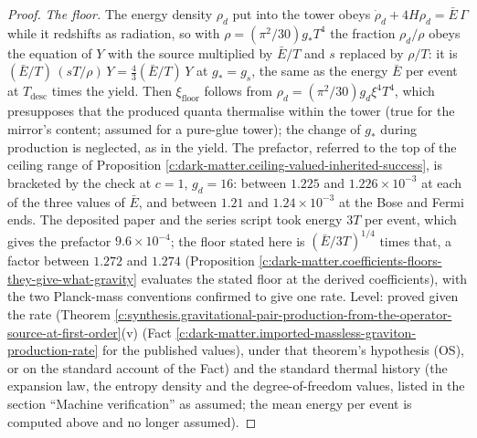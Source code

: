 \documentclass[11pt]{article}
\theoremstyle{definition}
\theoremstyle{plain}
\begin{document}
\begin{proof}
\emph{The floor.} The energy density $\rho_{d}$ put into the tower obeys $\dot{\rho}_{d} + 4H\rho_{d} = \bar{E}\,\Gamma$ while it redshifts as radiation, so with $\rho = (\pi^{2}/30)g_{*}T^{4}$ the fraction $\rho_{d}/\rho$ obeys the equation of $Y$ with the source multiplied by $\bar{E}/T$ and $s$ replaced by $\rho/T$: it is $(\bar{E}/T)\,(sT/\rho)\,Y = \tfrac43(\bar{E}/T)\,Y$ at $g_{*} = g_{s}$, the same as the energy $\bar{E}$ per event at $T_{\mathrm{desc}}$ times the yield. Then $\xi_{\mathrm{floor}}$ follows from $\rho_{d} = (\pi^{2}/30)g_{d}\xi^{4}T^{4}$, which presupposes that the produced quanta thermalise within the tower (true for the mirror's content; assumed for a pure-glue tower); the change of $g_{*}$ during production is neglected, as in the yield. The prefactor, referred to the top of the ceiling range of Proposition \ref{c:dark-matter.ceiling-valued-inherited-success}, is bracketed by the check at $c = 1$, $g_{d} = 16$: between $1.225$ and $1.226 \times 10^{-3}$ at each of the three values of $\bar{E}$, and between $1.21$ and $1.24 \times 10^{-3}$ at the Bose and Fermi ends. The deposited paper and the series script took energy $3T$ per event, which gives the prefactor $9.6 \times 10^{-4}$; the floor stated here is $(\bar{E}/3T)^{1/4}$ times that, a factor between $1.272$ and $1.274$ (Proposition \ref{c:dark-matter.coefficients-floors-they-give-what-gravity} evaluates the stated floor at the derived coefficients), with the two Planck-mass conventions confirmed to give one rate. Level: proved given the rate (Theorem \ref{c:synthesis.gravitational-pair-production-from-the-operator-source-at-first-order}(v) (Fact \ref{c:dark-matter.imported-massless-graviton-production-rate} for the published values), under that theorem's hypothesis (OS), or on the standard account of the Fact) and the standard thermal history (the expansion law, the entropy density and the degree-of-freedom values, listed in the section ``Machine verification'' as assumed; the mean energy per event is computed above and no longer assumed).

\end{proof}
\end{document}
